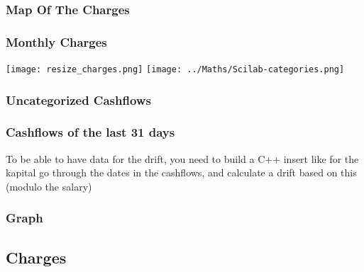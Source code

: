 \documentclass[8pt]{article} %
\begin{document}
\subsubsection{Map Of The Charges}
%

\subsubsection{Monthly Charges}
\texttt{[image: resize\_charges.png]}
\texttt{[image: ../Maths/Scilab-categories.png]}

%


\subsubsection{Uncategorized Cashflows}
%

\subsubsection{Cashflows of the last 31 days}

%
To be able to have data for the drift, you need to build a C++ insert like for the kapital
go through the dates in the cashflows, and calculate a drift based on this (modulo the salary) 
\subsubsection{Graph}
%
%
%

\subsection{Charges}

\end{document}
